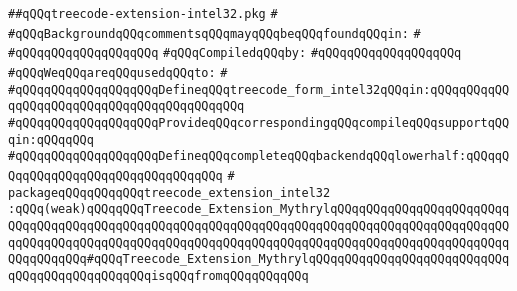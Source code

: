 \label{src/lib/compiler/back/low/main/intel32/treecode-extension-intel32.pkg}
\verb|##qQQqtreecode-extension-intel32.pkg|\newline
\verb|#|\newline
\verb|#qQQqBackgroundqQQqcommentsqQQqmayqQQqbeqQQqfoundqQQqin:|\newline
\verb|#|\newline
\verb|#qQQqqQQqqQQqqQQqqQQq|\newline
\newline
\verb|#qQQqCompiledqQQqby:|\newline
\verb|#qQQqqQQqqQQqqQQqqQQq|\newline
\newline
\verb|#qQQqWeqQQqareqQQqusedqQQqto:|\newline
\verb|#|\newline
\verb|#qQQqqQQqqQQqqQQqqQQqDefineqQQqtreecode_form_intel32qQQqin:qQQqqQQqqQQqqQQqqQQqqQQqqQQqqQQqqQQqqQQqqQQq|\newline
\verb|#qQQqqQQqqQQqqQQqqQQqProvideqQQqcorrespondingqQQqcompileqQQqsupportqQQqin:qQQqqQQq|\newline
\verb|#qQQqqQQqqQQqqQQqqQQqDefineqQQqcompleteqQQqbackendqQQqlowerhalf:qQQqqQQqqQQqqQQqqQQqqQQqqQQqqQQqqQQq|\newline
\verb|#|\newline
\verb|packageqQQqqQQqqQQqtreecode_extension_intel32|\newline
\verb|:qQQq(weak)qQQqqQQqTreecode_Extension_MythrylqQQqqQQqqQQqqQQqqQQqqQQqqQQqqQQqqQQqqQQqqQQqqQQqqQQqqQQqqQQqqQQqqQQqqQQqqQQqqQQqqQQqqQQqqQQqqQQqqQQqqQQqqQQqqQQqqQQqqQQqqQQqqQQqqQQqqQQqqQQqqQQqqQQqqQQqqQQqqQQqqQQqqQQqqQQqqQQq#qQQqTreecode_Extension_MythrylqQQqqQQqqQQqqQQqqQQqqQQqqQQqqQQqqQQqqQQqqQQqqQQqisqQQqfromqQQqqQQqqQQq|\newline
